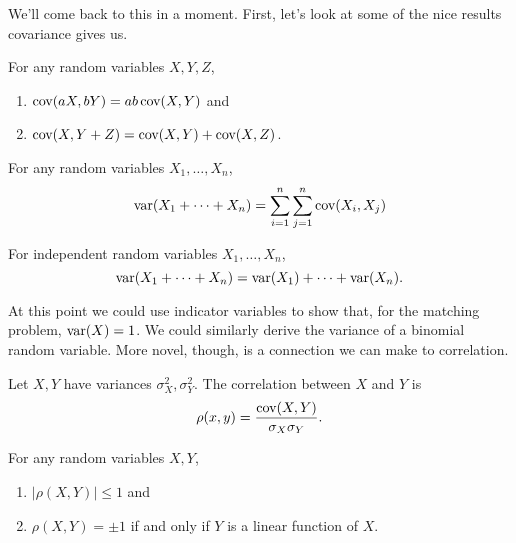 \documentclass[../m157main.tex]{subfiles}
\begin{document}
We'll come back to this in a moment.
First, let's look at some of the nice results covariance gives us.

\begin{theorem}
    For any random variables $X,Y,Z$,
    \begin{enumerate}[label=(\alph*)]
        \item $\textrm{cov}(aX, bY) = ab \,\textrm{cov}(X,Y)$ and
        \item $\textrm{cov} (X, Y+Z) = \textrm{cov}(X,Y) + \textrm{cov}(X,Z)$.
    \end{enumerate}
\end{theorem}

\begin{theorem}
    For any random variables $X_1, \ldots, X_n$,    \vspace{-6pt}
    \[ \textrm{var} (X_1 + \cdots + X_n) = \sum_{i=1}^{n} \sum_{j=1}^{n} \textrm{cov}(X_i, X_j) \]
\end{theorem}

\begin{corollary}[]
    For independent random variables $X_1, \ldots, X_n$,
    \[ \textrm{var}(X_1 + \cdots + X_n) = \textrm{var}(X_1) + \cdots + \textrm{var}(X_n). \]
\end{corollary}

At this point we could use indicator variables to show that, for the matching problem, $\textrm{var}(X) = 1$.
We could similarly derive the variance of a binomial random variable.
More novel, though, is a connection we can make to correlation.

\begin{definition}[Correlation]
    Let $X,Y$ have variances $\sigma_X^2,\sigma_Y^2$.
    The correlation between $X$ and $Y$ is
    \[ \rho(x,y) = \frac{\textrm{cov}(X,Y)}{\sigma_X \sigma_Y}. \]
\end{definition}

\begin{theorem}
    For any random variables $X,Y$,
    \begin{enumerate}[label=(\alph*)]
        \item $|\rho(X,Y)| \leq 1$ and
        \item $\rho(X,Y) = \pm 1$ if and only if $Y$ is a linear function of $X$.
    \end{enumerate}
\end{theorem}
\end{document}
